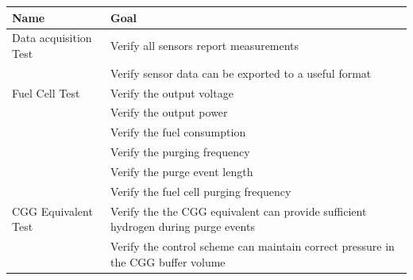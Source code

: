 \begin{table}[htp]
    \begin{tabularx}{\textwidth}{lX}
        \toprule
        \textbf{Name} & \textbf{Goal}                                                                                   \\

        \midrule
        Data acquisition Test
                      & Verify all sensors report measurements                                                          \\
                      & Verify sensor data can be exported to a useful format                                           \\


        \midrule
        Fuel Cell Test
                      & Verify the output voltage                                                                       \\
                      & Verify the output power                                                                         \\
                      & Verify the fuel consumption                                                                     \\
                      & Verify the purging frequency                                                                    \\
                      & Verify the purge event length                                                                   \\
                      & Verify the fuel cell purging frequency                                                          \\

        \midrule
        CGG Equivalent Test
                      & Verify the the CGG equivalent can provide sufficient hydrogen during purge events               \\
                      & Verify the control scheme can maintain correct pressure in the CGG buffer volume                \\


\end{tabularx}
\end{table}
